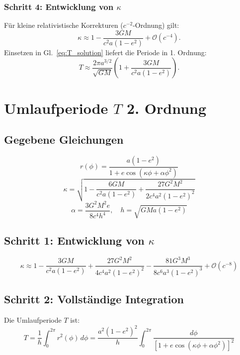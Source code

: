 \subsubsection*{Schritt 4: Entwicklung von $\kappa$}
Für kleine relativistische Korrekturen ($c^{-2}$-Ordnung) gilt:
\begin{equation}
    \kappa \approx 1 - \frac{3GM}{c^2 a(1-e^2)} + \mathcal{O}(c^{-4}).
    \label{eq:kappa_expansion}
\end{equation}
Einsetzen in Gl.~\eqref{eq:T_solution} liefert die Periode in 1. Ordnung:
\begin{equation}
    \boxed{
    T \approx \frac{2\pi a^{3/2}}{\sqrt{GM}} \left(1 + \frac{3GM}{c^2 a(1-e^2)}\right).
    }
    \label{eq:T_final}
\end{equation}

\section{Umlaufperiode \( T \) 2. Ordnung}

\subsection*{Gegebene Gleichungen}
\begin{equation}
r(\phi) = \frac{a(1-e^2)}{1 + e\cos\left(\kappa\phi + \alpha\phi^2\right)} \label{eq:orbit}
\end{equation}
\begin{equation}
\kappa = \sqrt{1 - \frac{6GM}{c^2a(1-e^2)} + \frac{27G^2M^2}{2c^4a^2(1-e^2)^2}} \label{eq:kappa}
\end{equation}
\begin{equation}
\alpha = \frac{3G^2M^2e}{8c^4h^4}, \quad h = \sqrt{GMa(1-e^2)} \label{eq:alpha}
\end{equation}

\subsection*{Schritt 1: Entwicklung von \(\kappa\)}
\begin{equation}
\kappa \approx 1 - \frac{3GM}{c^2a(1-e^2)} + \frac{27G^2M^2}{4c^4a^2(1-e^2)^2} - \frac{81G^3M^3}{8c^6a^3(1-e^2)^3} + \mathcal{O}(c^{-8}) 
\end{equation}

\subsection*{Schritt 2: Vollständige Integration}
Die Umlaufperiode \( T \) ist:
\begin{equation}
T = \frac{1}{h} \int_0^{2\pi} r^2(\phi) \, d\phi = \frac{a^2(1-e^2)^2}{h} \int_0^{2\pi} \frac{d\phi}{\left[1 + e\cos\left(\kappa\phi + \alpha\phi^2\right)\right]^2} \label{eq:T_integral}
\end{equation}

